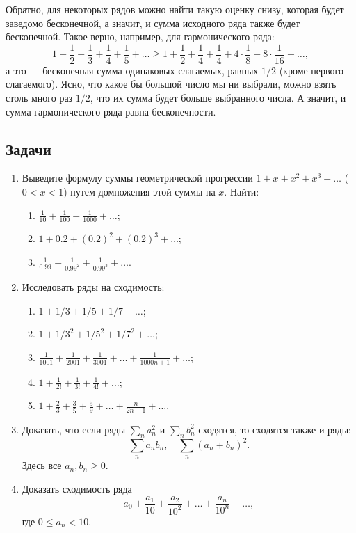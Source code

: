 Обратно, для некоторых рядов можно найти такую оценку снизу, которая будет заведомо бесконечной, а значит, и сумма исходного ряда также будет бесконечной. Такое верно, например, для гармонического ряда:
$$
1+\frac{1}{2}+\frac{1}{3}+\frac{1}{4}+\frac{1}{5}+\dots \ge 
1+\frac{1}{2}+\frac{1}{4}+\frac{1}{4}+4\cdot\frac{1}{8}+8\cdot\frac{1}{16}+\dots,
$$
а это --- бесконечная сумма одинаковых слагаемых, равных $1/2$ (кроме первого слагаемого). Ясно, что какое бы большой число мы ни выбрали, можно взять столь много раз $1/2$, что их сумма будет больше выбранного числа. А значит, и сумма гармонического ряда равна бесконечности.

\subsection*{Задачи}

\begin{enumerate}
\item Выведите формулу суммы геометрической прогрессии $1+x+x^2+x^3+\dots$ ($0<x<1$) путем домножения этой суммы на $x$. Найти:
\begin{enumerate}
\item $\displaystyle \frac{1}{10}+\frac{1}{100}+\frac{1}{1000}+\dots$;
\item $\displaystyle 1+0.2+(0.2)^2+(0.2)^3+\dots$;
\item $\displaystyle \frac{1}{0.99}+\frac{1}{0.99^2}+\frac{1}{0.99^3}+\dots$.
\end{enumerate}
\item Исследовать ряды на сходимость:
\begin{enumerate}
\item $1+1/3+1/5+1/7+\dots$;
\item $1+1/3^2+1/5^2+1/7^2+\dots$;
\item $\displaystyle \frac{1}{1001}+\frac{1}{2001}+\frac{1}{3001}+\dots+\frac{1}{1000n+1}+\dots$;
\item $\displaystyle 1+\frac{1}{2!}+\frac{1}{3!}+\frac{1}{4!}+\dots$;
\item $\displaystyle 1+\frac{2}{3}+\frac{3}{5}+\frac{5}{9}+\dots+\frac{n}{2n-1}+\dots$.
\end{enumerate}
\item Доказать, что если ряды $\displaystyle \sum_na_n^2$ и $\displaystyle \sum_nb_n^2$ сходятся, то сходятся также и ряды:
$$
\sum_na_nb_n,\quad \sum_n(a_n+b_n)^2.
$$
Здесь все $a_n,b_n\ge 0$.
\item Доказать сходимость ряда
$$
a_0+\frac{a_1}{10}+\frac{a_2}{10^2}+\dots+\frac{a_n}{10^n}+\dots,
$$
где $0\le a_n<10$.
\end{enumerate}





